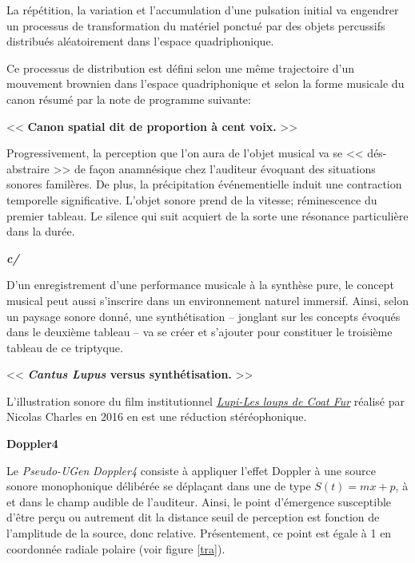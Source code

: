  La r\'{e}p\'{e}tition, la variation et l'accumulation d'une pulsation initial va engendrer un processus de transformation du mat\'{e}riel ponctu\'{e} par des objets percussifs distribu\'{e}s al\'{e}atoirement dans l'espace quadriphonique.
 
Ce processus de distribution est d\'{e}fini selon une m\^eme trajectoire d'un mouvement brownien dans l'espace quadriphonique et selon la forme musicale du canon r\'{e}sum\'{e} par la note de programme suivante:

\bigskip

 << \textbf{Canon spatial dit de proportion \`{a} cent voix.} >>
 
 \bigskip

 Progressivement, la perception que l'on aura de l'objet musical va se << d\'{e}s-abstraire >> de fa\c{c}on anamn\'{e}sique chez l'auditeur \'{e}voquant des situations sonores famil\`{e}res. 
De plus, la pr\'{e}cipitation \'{e}v\'{e}nementielle induit une contraction temporelle significative. L'objet sonore prend de la vitesse; r\'{e}minescence du premier tableau. Le silence qui suit acquiert de la sorte une r\'{e}sonance particuli\`{e}re dans la dur\'{e}e.

\bigskip
\bigskip

 \textbf{\textit{c/}}
 
 D'un enregistrement d'une performance musicale \`{a} la synth\`{e}se pure, le concept musical peut aussi s'inscrire dans un environnement naturel immersif. Ainsi, selon un paysage sonore donn\'{e}, une synth\'{e}tisation -- jonglant sur les concepts \'{e}voqu\'{e}s dans le deuxi\`{e}me tableau -- va se cr\'{e}er et s'ajouter pour constituer le troisi\`{e}me tableau de ce triptyque.     

\bigskip

  << \textbf{\textit{Cantus Lupus} versus synth\'{e}tisation.} >>
  
  \bigskip
  L'illustration sonore du film institutionnel \href{http://refugedesloups.org/video/version\%203\%20refuge\%20des\%20loups.mp4}{\textit{Lupi-Les loups de Coat Fur}} r\'ealis\'e par Nicolas Charles en 2016 en est une r\'eduction st\'er\'eophonique. 
  
  \bigskip
\bigskip
  \bigskip

\noindent \textbf{{\large Doppler4}}
\hrulefill
\label{dop}

  \bigskip

Le \textit{Pseudo-UGen}  \textsl{Doppler4} consiste \`a appliquer l'effet Doppler \`a une source sonore monophonique d\'elib\'er\'ee se d\'epla\c{c}ant dans une  de type $S(t)=m x +p$, \`a  et dans le champ audible de l'auditeur. Ainsi, le point d'\'emergence susceptible d'\^etre per\c{c}u ou autrement dit la distance seuil de perception est fonction de l'amplitude de la source, donc relative. Pr\'esentement, ce point est \'egale \`a 1 en coordonn\'ee radiale polaire (voir figure \ref{tra}). 

